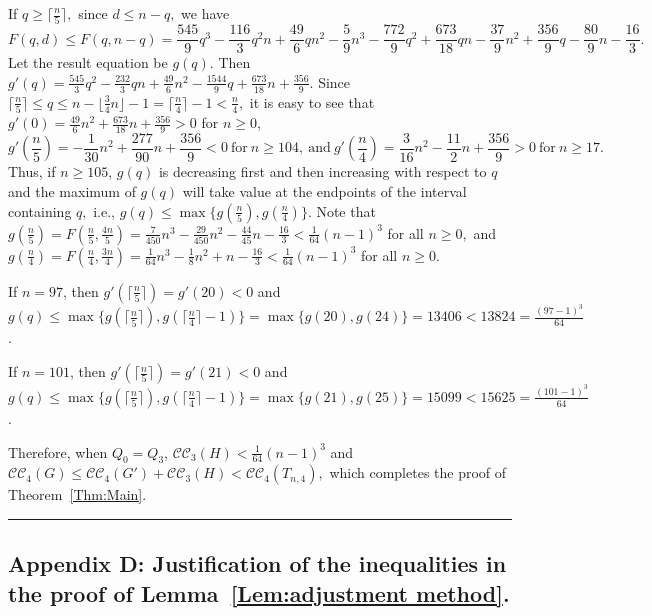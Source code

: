 \documentclass[11pt,a4paper]{article}
\def\QED{\hfill \rule{7pt}{7pt}}
\newcommand{\turangraph}[2]{T_{#1,#2}}
\newcommand{\coveropt}[2]{{\mathcal{C}\mathcal{C}_{#1}(#2)}}
\begin{document}
If $q\ge \lceil \frac n 5 \rceil,$ since $d\le n-q,$ we have
\begin{equation*}\label{Equ:g2(q)}
F(q,d)\le F(q,n-q)=\frac{545}{9}q^3-\frac{116}{3}q^2n+\frac{49}{6}qn^2-\frac{5}{9}n^3-\frac{772}{9}q^2+\frac{673}{18}qn-\frac{37}{9}n^2+\frac{356}{9}q-\frac{80}{9}n-\frac {16} 3.
\end{equation*}
Let the result equation be $g(q).$ 
Then $g'(q)=\frac{545}{3}q^2-\frac{232}{3}qn+\frac{49}{6}n^2-\frac{1544}{9}q+\frac{673}{18}n+\frac{356}{9}.$
Since $\lceil \frac n 5 \rceil\le q\le n-\lfloor\frac{3}{4}n\rfloor-1=\lceil\frac{n}{4}\rceil-1<\frac n 4,$
it is easy to see that 
$g'(0)=\frac{49}{6}n^2+\frac{673}{18}n+\frac{356}{9}>0$ for $n\ge 0$,
$$g'(\frac n 5)=-\frac{1}{30}n^2+\frac{277}{90}n+\frac{356}{9}<0 \ \text{for}\ n\ge 104, \ \text{and}\  g'(\frac n 4)=\frac{3}{16}n^2-\frac{11}{2}n+\frac{356}{9}>0\ \text{for}\ n\ge 17.$$
Thus, if $n\ge 105$,  
$g(q)$ is decreasing first and then increasing with respect to $q$
and the maximum of $g(q)$ will take value at the endpoints of the interval containing $q,$ i.e., 
$g(q)\le \max\{g(\frac n 5),g(\frac{n}{4})\}$.
Note that 
$g(\frac n 5)=F(\frac n 5,\frac {4n} 5)=\frac{7}{450}n^3-\frac{29}{450}n^2-\frac{44}{45}n-\frac {16} 3<\frac{1}{64}(n-1)^3$ for all $n\ge 0,$
and 
$g(\frac{n}{4})=F(\frac n 4,\frac {3n} 4)=\frac{1}{64}n^3-\frac{1}{8}n^2+n-\frac{16}{3}<\frac{1}{64}(n-1)^3$
for all $n\ge 0$.

If $n=97$, then
$g'(\lceil \frac n 5 \rceil)=g'(20)<0$
and $g(q)\le \max\{g(\lceil \frac n 5 \rceil), g(\lceil\frac{n}{4}\rceil-1)\}=\max\{g(20), g(24)\}=13406<13824=\frac{(97-1)^3}{64}$.

If $n=101$, then 
$g'(\lceil \frac n 5 \rceil)=g'(21)<0$
and $g(q)\le \max\{g(\lceil \frac n 5 \rceil), g(\lceil\frac{n}{4}\rceil-1)\}=\max\{g(21), g(25)\}=15099<15625=\frac{(101-1)^3}{64}$.

Therefore, when $Q_0=Q_3$, $\coveropt{3}{H}<\frac{1}{64}(n-1)^3$ and 
$\coveropt{4}{G}\le \coveropt{4}{G'}+\coveropt{3}{H}<\coveropt{4}{\turangraph{n}{4}},$ 
which completes the proof of Theorem~\ref{Thm:Main}.
\QED


\subsection*{Appendix D: Justification of the inequalities in the proof of Lemma~\ref{Lem:adjustment method}.}
\end{document}
